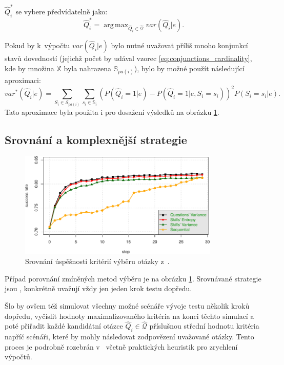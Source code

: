 \documentclass[a4paper,twoside,12pt]{scrbook}
\DeclareMathOperator*{\argmax}{arg\,max}
\begin{document}
$\widehat{Q}^*_i$ se vybere předvídatelně jako:
\begin{equation}
	\widehat{Q}^*_i = \argmax_{\widehat{Q}_i \in \widehat{\mathcal{Q}}} var(\widehat{Q}_i|e).
\end{equation}

Pokud by k~výpočtu $var(\widehat{Q}_i|e)$ bylo nutné uvažovat příliš mnoho konjunkcí stavů dovedností (jejichž počet by udával vzorec \ref{eq:conjunctions_cardinality}, kde by množina $\mathbb{X}$ byla nahrazena $\mathbb{S}_{pa(i)}$), bylo by možné použít následující aproximaci:
\begin{equation}
	var^*(\widehat{Q}_i|e) = \sum_{S_i \in \mathcal{S}_{pa(i)}}\sum_{s_i \in \mathbb{S}_i} \left(P(\widehat{Q}_i=1|e) - P(\widehat{Q}_i=1|e, S_i = s_i) \right)^2 P(S_i = s_i|e).
\end{equation}
Tato aproximace byla použita i pro dosažení výsledků na obrázku \ref{fig:question_selection_comparison}.

\subsection{Srovnání a komplexnější strategie}

\begin{figure}
  \centering
    \includegraphics[width=0.85\textwidth]{question_selection_comparison.pdf}
  \caption{Srovnání úspěšnosti kritérií výběru otázky z~\cite{question_selection}.}
  \label{fig:question_selection_comparison}
\end{figure}

Případ porovnání zmíněných metod výběru je na obrázku \ref{fig:question_selection_comparison}. Srovnávané strategie jsou , konkrétně uvažují vždy jen jeden krok testu dopředu.

Šlo by ovšem též simulovat všechny možné scénáře vývoje testu několik kroků dopředu, vyčíslit hodnoty maximalizovaného kritéria na konci těchto simulací a poté přiřadit každé kandidátní otázce $\widehat{Q}_i \in \widehat{\mathcal{Q}}$ příslušnou střední hodnotu kritéria napříč scénáři, které by mohly následovat zodpovězení uvažované otázky. Tento proces je podrobně rozebrán v~\cite{vomlel_building} včetně praktických heuristik pro zrychlení výpočtů.
\end{document}
